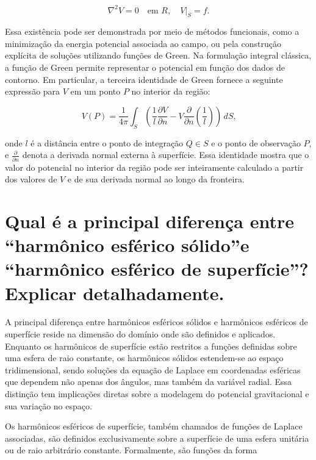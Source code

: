 \[
\nabla^2 V = 0 \quad \text{em } R, \quad V|_S = f \text{.}
\]

\noindent
Essa existência pode ser demonstrada por meio de métodos funcionais, como a minimização da energia potencial associada ao campo, ou pela construção explícita de soluções utilizando funções de Green. Na formulação integral clássica, a função de Green permite representar o potencial em função dos dados de contorno. Em particular, a terceira identidade de Green fornece a seguinte expressão para \( V \) em um ponto \( P \) no interior da região:

\[
V(P) = \frac{1}{4\pi} \int_S \left( \frac{1}{l} \frac{\partial V}{\partial n} - V \frac{\partial}{\partial n} \left( \frac{1}{l} \right) \right) \, dS \text{,}
\]

\noindent
onde \( l \) é a distância entre o ponto de integração \( Q \in S \) e o ponto de observação \( P \), e \( \frac{\partial}{\partial n} \) denota a derivada normal externa à superfície. Essa identidade mostra que o valor do potencial no interior da região pode ser inteiramente calculado a partir dos valores de \( V \) e de sua derivada normal ao longo da fronteira.




\section{Qual é a principal diferença entre “harmônico esférico sólido”e “harmônico esférico de superfície”? Explicar detalhadamente.}


A principal diferença entre harmônicos esféricos sólidos e harmônicos esféricos de superfície reside na dimensão do domínio onde são definidos e aplicados. Enquanto os harmônicos de superfície estão restritos a funções definidas sobre uma esfera de raio constante, os harmônicos sólidos estendem-se ao espaço tridimensional, sendo soluções da equação de Laplace em coordenadas esféricas que dependem não apenas dos ângulos, mas também da variável radial. Essa distinção tem implicações diretas sobre a modelagem do potencial gravitacional e sua variação no espaço.

Os harmônicos esféricos de superfície, também chamados de funções de Laplace associadas, são definidos exclusivamente sobre a superfície de uma esfera unitária ou de raio arbitrário constante. Formalmente, são funções da forma

